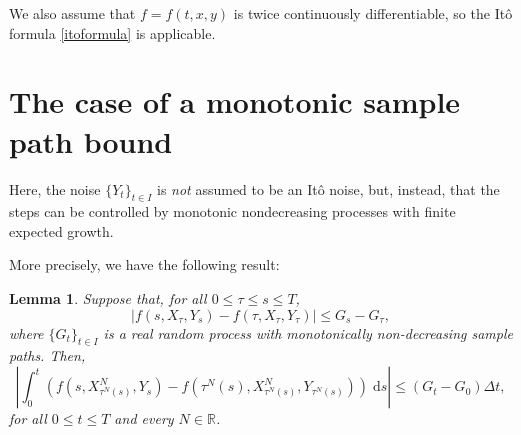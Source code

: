 \documentclass[reqno,12pt]{amsart}
\theoremstyle{plain}%
\newtheorem{lem}{Lemma}[section]
\theoremstyle{definition}
\begin{document}
We also assume that $f=f(t, x, y)$ is twice continuously differentiable, so the It\^o formula \eqref{itoformula} is applicable.

\section{The case of a monotonic sample path bound}

Here, the noise $\{Y_t\}_{t\in I}$ is \emph{not} assumed to be an It\^o noise, but, instead, that the steps can be controlled by monotonic nondecreasing processes with finite expected growth.

More precisely, we have the following result:
\begin{lem}
    \label{lemmonotonicbound}
    Suppose that, for all $0 \leq \tau \leq s \leq T$,
    \begin{equation}
      \label{monotonicbound}
        |f(s, X_\tau, Y_s) - f(\tau, X_\tau, Y_\tau)| \leq G_s - G_\tau,
    \end{equation}
    where $\{G_t\}_{t\in I}$ is a real random process with monotonically non-decreasing sample paths. Then,
    \begin{equation}
      \label{intfboundbyG}
        \left|\int_0^t \left( f(s, X_{\tau^N(s)}^N, Y_s) - f(\tau^N(s), X_{\tau^N(s)}^N, Y_{\tau^N(s)}) \right)\;\mathrm{d}s\right| \leq (G_t - G_0)\Delta t,
    \end{equation}
    for all $0 \leq t \leq T$ and every $N\in \mathbb{R}$.
\end{lem}
\end{document}
